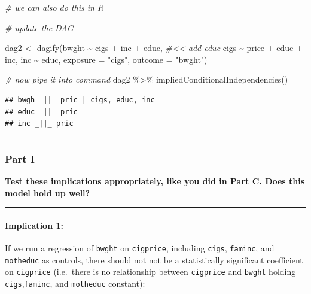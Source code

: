 \documentclass[
]{article}
\newenvironment{Shaded}{\begin{snugshade}}{\end{snugshade}}
\newcommand{\AttributeTok}[1]{\textcolor[rgb]{0.77,0.63,0.00}{#1}}
\newcommand{\CommentTok}[1]{\textcolor[rgb]{0.56,0.35,0.01}{\textit{#1}}}
\newcommand{\FunctionTok}[1]{\textcolor[rgb]{0.00,0.00,0.00}{#1}}
\newcommand{\NormalTok}[1]{#1}
\newcommand{\OtherTok}[1]{\textcolor[rgb]{0.56,0.35,0.01}{#1}}
\newcommand{\SpecialCharTok}[1]{\textcolor[rgb]{0.00,0.00,0.00}{#1}}
\newcommand{\StringTok}[1]{\textcolor[rgb]{0.31,0.60,0.02}{#1}}
\begin{document}
\begin{Shaded}
\begin{Highlighting}[]
\CommentTok{\# we can also do this in R}

\CommentTok{\# update the DAG}

\NormalTok{dag2 }\OtherTok{\textless{}{-}} \FunctionTok{dagify}\NormalTok{(bwght }\SpecialCharTok{\textasciitilde{}}\NormalTok{ cigs }\SpecialCharTok{+}\NormalTok{ inc }\SpecialCharTok{+}\NormalTok{ educ, }\CommentTok{\#\textless{}\textless{} add educ}
\NormalTok{       cigs }\SpecialCharTok{\textasciitilde{}}\NormalTok{ price }\SpecialCharTok{+}\NormalTok{ educ }\SpecialCharTok{+}\NormalTok{ inc,}
\NormalTok{       inc }\SpecialCharTok{\textasciitilde{}}\NormalTok{ educ,}
       \AttributeTok{exposure =} \StringTok{"cigs"}\NormalTok{,}
       \AttributeTok{outcome =} \StringTok{"bwght"}\NormalTok{)}

\CommentTok{\# now pipe it into command}
\NormalTok{dag2 }\SpecialCharTok{\%\textgreater{}\%} \FunctionTok{impliedConditionalIndependencies}\NormalTok{()}
\end{Highlighting}
\end{Shaded}

\begin{verbatim}
## bwgh _||_ pric | cigs, educ, inc
## educ _||_ pric
## inc _||_ pric
\end{verbatim}

\begin{center}\rule{0.5\linewidth}{0.5pt}\end{center}

\hypertarget{part-i}{%
\subsubsection{Part I}\label{part-i}}

\textbf{Test these implications appropriately, like you did in Part C.
Does this model hold up well?}

\begin{center}\rule{0.5\linewidth}{0.5pt}\end{center}

\hypertarget{implication-1-1}{%
\paragraph{Implication 1:}\label{implication-1-1}}

If we run a regression of \texttt{bwght} on \texttt{cigprice}, including
\texttt{cigs}, \texttt{faminc}, and \texttt{motheduc} as controls, there
should not not be a statistically significant coefficient on
\texttt{cigprice} (i.e.~there is no relationship between
\texttt{cigprice} and \texttt{bwght} holding
\texttt{cigs},\texttt{faminc}, and \texttt{motheduc} constant):
\end{document}
